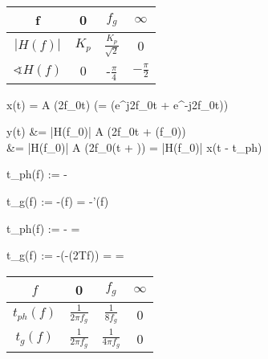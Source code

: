\begin{abox}
	\begin{tabular}{c | c c c}
		f & 0 & $f_g$ & $\infty$\\\hline
		$\left|H(f)\right|$ & $K_p$ & $\frac{K_p}{\sqrt{2}}$ & 0\\
		$\sphericalangle H(f)$ & 0 & -$\frac{\pi}{4}$ & $-\frac{\pi}{2}$
	\end{tabular}
\end{abox}

\begin{abox}
	x(t) = A \cdot \cos(2\pi f_0t) \quad \left(= (e^{j2\pi f_0t} + e^{-j2\pi f_0t})\right)
\end{abox}

\begin{abox}
	y(t) &= \left|H(f_0)\right| \cdot A \cdot \cos(2\pi f_0t + \varphi(f_0))\\
	&=  \left|H(f_0)\right| \cdot A \cdot \cos(2\pi f_0(t + )) = \left|H(f_0)\right| \cdot x(t - t_{ph})
\end{abox}

\begin{abox}
	t_{ph}(f) := -
\end{abox}

\begin{abox}
	t_g(f) := -\varphi(f) = -\varphi'(f)
\end{abox}

\begin{abox}
	t_{ph}(f) := - = 
\end{abox}

\begin{abox}
	t_g(f) := -(-\arctan(2\pi Tf)) =  = \cdot{}
\end{abox}

\begin{tbox}
	\begin{tabular}{c || c | c | c}
		$f$ & 0 & $f_g$ & $\infty$\\\hline\hline
		$t_{ph}(f)$ & $\frac{1}{2\pi f_g}$ & $\frac{1}{8f_g}$ & 0\\\hline
		$t_g(f)$ &  $\frac{1}{2\pi f_g}$ & $\frac{1}{4\pi f_g}$ & 0
	\end{tabular}
\end{tbox}

